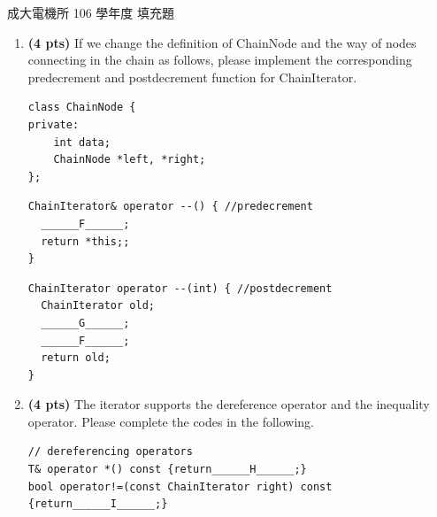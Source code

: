 \begin{pastexam}[label={px:ncku-106-ee-ds-08}]{成大電機所 106 學年度 填充題}
\begin{enumerate}[leftmargin=2.5em]
\item[(三)] \textbf{(4 pts)} If we change the definition of ChainNode and the way of nodes connecting in the
chain as follows, please implement the corresponding predecrement and postdecrement function for
ChainIterator.
\begin{verbatim}
class ChainNode {
private:
    int data;
    ChainNode *left, *right;
};
\end{verbatim}

\begin{center}
\end{center}

\begin{verbatim}
ChainIterator& operator --() { //predecrement
  ______F______;
  return *this;;
}
\end{verbatim}
\smallskip
\begin{verbatim}
ChainIterator operator --(int) { //postdecrement
  ChainIterator old;
  ______G______;
  ______F______;
  return old;
}
\end{verbatim}

\item[(四)] \textbf{(4 pts)} The iterator supports the dereference operator and the inequality operator. Please
complete the codes in the following.
\begin{verbatim}
// dereferencing operators
T& operator *() const {return______H______;}
bool operator!=(const ChainIterator right) const
{return______I______;}
\end{verbatim}
\end{enumerate}
\end{pastexam}


